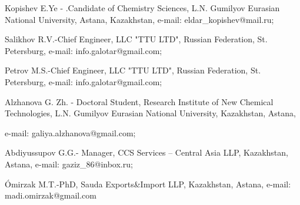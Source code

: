 Kopishev E.Ye - .Candidate of Chemistry Sciences, L.N. Gumilyov Eurasian
National University, Astana, Kazakhstan, e-mail:
eldar\_kopishev@mail.ru;

Salikhov R.V.-Chief Engineer, LLC "TTU LTD", Russian Federation, St.
Petersburg, e-mail: info.galotar@gmail.com;

Petrov M.S.-Chief Engineer, LLC "TTU LTD", Russian Federation, St.
Petersburg, e-mail: info.galotar@gmail.com;

Alzhanova G. Zh. - Doctoral Student, Research Institute of New Chemical
Technologies, L.N. Gumilyov Eurasian National University, Kazakhstan,
Astana,

e-mail: galiya.alzhanova@gmail.com;

Abdiyussupov G.G.- Manager, CCS Services -- Central Asia LLP,
Kazakhstan, Astana, e-mail: gaziz\_86@inbox.ru;

Ómirzak M.T.-PhD, Sauda Exports\&Import LLP, Kazakhstan, Astana, e-mail:
madi.omirzak@gmail.com
